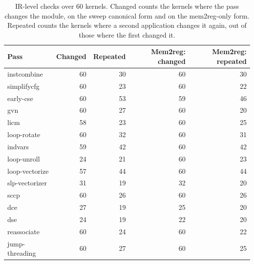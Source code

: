 \begin{table}[t]
\centering
\caption{IR-level checks over 60 kernels. Changed counts the kernels where the pass changes the module, on the sweep canonical form and on the mem2reg-only form. Repeated counts the kernels where a second application changes it again, out of those where the first changed it.}
\label{tab:passchecks}
\setlength{\tabcolsep}{3pt}
\begin{tabular}{|l|r|r|r|r|}
\hline
Pass & Changed & Repeated & Mem2reg: changed & Mem2reg: repeated \\
\hline
instcombine & 60 & 30 & 60 & 30 \\
\hline
simplifycfg & 60 & 23 & 60 & 22 \\
\hline
early-cse & 60 & 53 & 59 & 46 \\
\hline
gvn & 60 & 27 & 60 & 20 \\
\hline
licm & 58 & 23 & 60 & 25 \\
\hline
loop-rotate & 60 & 32 & 60 & 31 \\
\hline
indvars & 59 & 42 & 60 & 42 \\
\hline
loop-unroll & 24 & 21 & 60 & 23 \\
\hline
loop-vectorize & 57 & 44 & 60 & 44 \\
\hline
slp-vectorizer & 31 & 19 & 32 & 20 \\
\hline
sccp & 60 & 26 & 60 & 26 \\
\hline
dce & 27 & 19 & 25 & 20 \\
\hline
dse & 24 & 19 & 22 & 20 \\
\hline
reassociate & 60 & 24 & 60 & 22 \\
\hline
jump-threading & 60 & 27 & 60 & 25 \\
\hline
\end{tabular}
\end{table}
